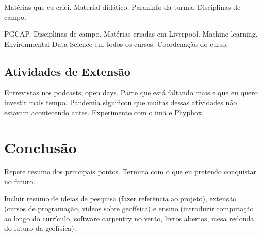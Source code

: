 \documentclass[10pt,a4paper,oneside]{book}
\begin{document}
Matérias que eu criei.
Material didático.
Paraninfo da turma.
Disciplinas de campo.

PGCAP.
Disciplinas de campo.
Matérias criadas em Liverpool.
Machine learning.
Environmental Data Science em todos os cursos.
Coordenação do curso.


\section{Atividades de Extensão}

Entrevistas nos podcasts, open days.
Parte que está faltando mais e que eu quero investir mais tempo.
Pandemia significou que muitas dessas atividades não estavam acontecendo antes.
Experimento com o imã e Phyphox.


\chapter{Conclusão}
\label{cap_conclusao}

Repete resumo dos principais pontos.
Termina com o que eu pretendo conquistar no futuro.

Incluir resumo de ideias de pesquisa (fazer referência ao projeto),
extensão (cursos de programação, videos sobre geofísica) e ensino (introduzir
computação ao longo do currículo, software carpentry no verão, livros abertos,
mesa redonda do futuro da geofísica).




\backmatter


\end{document}
